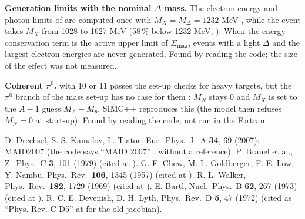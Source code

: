 \documentclass{simcnote}
\begin{document}
\begin{simcfindingbox}
\textbf{Generation limits with the nominal $\Delta$ mass.} The electron-energy and photon limits of
 are computed once with $M_X=M_\Delta=1232$ MeV ,
while the event takes $M_X$ from 1028 to 1627 MeV (58\,\% below 1232 MeV, ). When the
energy-conservation term is the active upper limit of $\Sigma_\mathrm{max}$, events with a light $\Delta$ and the
largest electron energies are never generated. Found by reading the code; the size of the effect was not measured.
\end{simcfindingbox}

\begin{simcfindingbox}
\textbf{Coherent $\pi^0$.}  with  10 or 11 passes the set-up checks for heavy
targets, but the $\pi^0$ branch of the mass set-up has no case for them : $M_N$ stays 0 and $M_X$
is set to the $A-1$ guess $M_A-M_p$. SIMC++ reproduces this (the model then refuses $M_N=0$ at start-up). Found by
reading the code; not run in the Fortran.
\end{simcfindingbox}

\begin{simcrefs}
 D. Drechsel, S. S. Kamalov, L. Tiator, Eur.\ Phys.\ J.\ A \textbf{34}, 69 (2007): MAID2007 (the code says
  ``MAID 2007'' , without a reference).
 P. Brauel et al., Z.\ Phys.\ C \textbf{3}, 101 (1979) (cited at ).
 G. F. Chew, M. L. Goldberger, F. E. Low, Y. Nambu, Phys.\ Rev.\ \textbf{106}, 1345 (1957) (cited at
  ).
 R. L. Walker, Phys.\ Rev.\ \textbf{182}, 1729 (1969) (cited at ).
 E. Bartl, Nucl.\ Phys.\ B \textbf{62}, 267 (1973) (cited at ).
 R. C. E. Devenish, D. H. Lyth, Phys.\ Rev.\ D \textbf{5}, 47 (1972) (cited as ``Phys. Rev. C D5'' at
   for the old jacobian).
\end{simcrefs}
\end{document}
